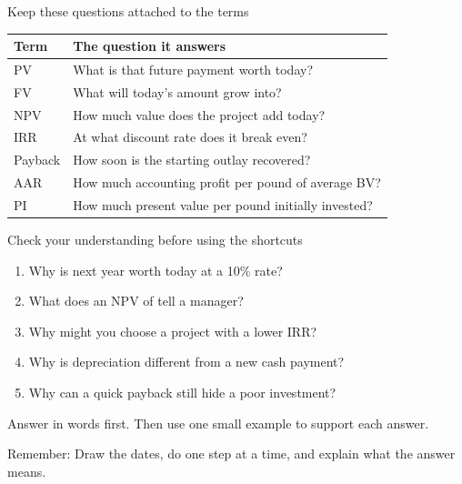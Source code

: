 \documentclass[10pt,aspectratio=169]{beamer}
\newcommand{\remember}[1]{\par\smallskip\alert{Remember:} #1}
\renewcommand{\pounds}{\ifmmode\text{\textsterling}\else\textsterling\fi}
\begin{document}
\begin{frame}{Keep these questions attached to the terms}
\par\smallskip\begingroup\centering
\begin{tabular}{lp{}}
\toprule Term & The question it answers\\\midrule
PV & What is that future payment worth today?\\[0.5em]
FV & What will today's amount grow into?\\[0.5em]
NPV & How much value does the project add today?\\[0.5em]
IRR & At what discount rate does it break even?\\[0.5em]
Payback & How soon is the starting outlay recovered?\\[0.5em]
AAR & How much accounting profit per pound of average BV?\\[0.5em]
PI & How much present value per pound initially invested?\\\bottomrule
\end{tabular}
\par\endgroup\smallskip
\end{frame}

\begin{frame}{Check your understanding before using the shortcuts}
\begin{enumerate}
\item Why is \pounds110 next year worth \pounds100 today at a 10\% rate?
\item What does an NPV of \pounds10 tell a manager?
\item Why might you choose a project with a lower IRR?
\item Why is depreciation different from a new cash payment?
\item Why can a quick payback still hide a poor investment?
\end{enumerate}
\par\smallskip
Answer in words first. Then use one small example to support each answer.
\remember{Draw the dates, do one step at a time, and explain what the answer means.}
\end{frame}
\end{document}
